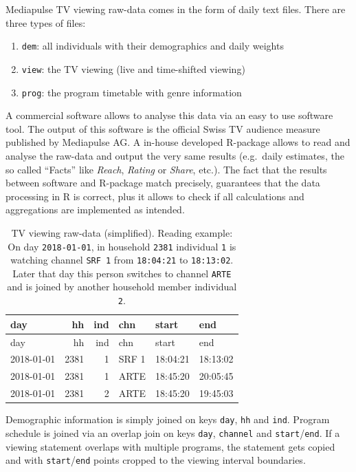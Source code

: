 \documentclass[]{article}
\providecommand{\tightlist}{%
  \setlength{\itemsep}{0pt}\setlength{\parskip}{0pt}}
\begin{document}
Mediapulse TV viewing raw-data comes in the form of daily text files.
There are three types of files:

\begin{enumerate}
\def\labelenumi{\arabic{enumi}.}
\tightlist
\item
  \texttt{dem}: all individuals with their demographics and daily
  weights
\item
  \texttt{view}: the TV viewing (live and time-shifted viewing)
\item
  \texttt{prog}: the program timetable with genre information
\end{enumerate}

A commercial software allows to analyse this data via an easy to use
software tool. The output of this software is the official Swiss TV
audience measure published by Mediapulse AG. A in-house developed
R-package allows to read and analyse the raw-data and output the very
same results (e.g.~daily estimates, the so called ``Facts'' like
\emph{Reach}, \emph{Rating} or \emph{Share}, etc.). The fact that the
results between software and R-package match precisely, guarantees that
the data processing in R is correct, plus it allows to check if all
calculations and aggregations are implemented as intended.

\begin{longtable}[]{@{}lrrlll@{}}
\caption{\label{tab:tab1}TV viewing raw-data (simplified). Reading
example: On day \texttt{2018-01-01}, in household \texttt{2381}
individual \texttt{1} is watching channel \texttt{SRF\ 1} from
\texttt{18:04:21} to \texttt{18:13:02}. Later that day this person
switches to channel \texttt{ARTE} and is joined by another household
member individual \texttt{2}.}\tabularnewline
\toprule
day & hh & ind & chn & start & end\tabularnewline
\midrule
\endfirsthead
\toprule
day & hh & ind & chn & start & end\tabularnewline
\midrule
\endhead
2018-01-01 & 2381 & 1 & SRF 1 & 18:04:21 & 18:13:02\tabularnewline
2018-01-01 & 2381 & 1 & ARTE & 18:45:20 & 20:05:45\tabularnewline
2018-01-01 & 2381 & 2 & ARTE & 18:45:20 & 19:45:03\tabularnewline
\bottomrule
\end{longtable}

Demographic information is simply joined on keys \texttt{day},
\texttt{hh} and \texttt{ind}. Program schedule is joined via an overlap
join on keys \texttt{day}, \texttt{channel} and
\texttt{start}/\texttt{end}. If a viewing statement overlaps with
multiple programs, the statement gets copied and with
\texttt{start}/\texttt{end} points cropped to the viewing interval
boundaries.
\end{document}
